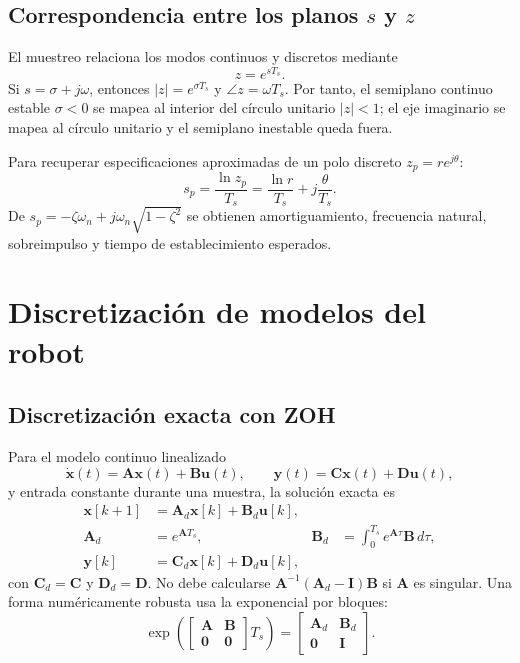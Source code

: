 \documentclass[11pt,letterpaper]{article}
\newcommand{\vect}[1]{\bm{#1}}
\newcommand{\mat}[1]{\bm{#1}}
\begin{document}
\subsection{Correspondencia entre los planos $s$ y $z$}
El muestreo relaciona los modos continuos y discretos mediante
\begin{equation}
 z=e^{sT_s}.
 \label{eq:szmap}
\end{equation}
Si $s=\sigma+j\omega$, entonces $|z|=e^{\sigma T_s}$ y
$\angle z=\omega T_s$. Por tanto, el semiplano continuo estable $\sigma<0$ se
mapea al interior del círculo unitario $|z|<1$; el eje imaginario se mapea al
círculo unitario y el semiplano inestable queda fuera.

Para recuperar especificaciones aproximadas de un polo discreto
$z_p=r e^{j\theta}$:
\begin{equation}
 s_p=\frac{\ln z_p}{T_s}
 =\frac{\ln r}{T_s}+j\frac{\theta}{T_s}.
\end{equation}
De $s_p=-\zeta\omega_n+j\omega_n\sqrt{1-\zeta^2}$ se obtienen amortiguamiento,
frecuencia natural, sobreimpulso y tiempo de establecimiento esperados.

\section{Discretización de modelos del robot}
\subsection{Discretización exacta con ZOH}
Para el modelo continuo linealizado
\begin{equation}
 \dot{\vect x}(t)=\mat A\vect x(t)+\mat B\vect u(t),\qquad
 \vect y(t)=\mat C\vect x(t)+\mat D\vect u(t),
 \label{eq:sscontinuous}
\end{equation}
y entrada constante durante una muestra, la solución exacta es
\begin{align}
 \vect x[k+1]&=\mat A_d\vect x[k]+\mat B_d\vect u[k],\label{eq:ssdiscrete}\\
 \mat A_d&=e^{\mat A T_s},&
 \mat B_d&=\int_0^{T_s}e^{\mat A\tau}\mat B\,d\tau,\label{eq:exactdisc}\\
 \vect y[k]&=\mat C_d\vect x[k]+\mat D_d\vect u[k],
\end{align}
con $\mat C_d=\mat C$ y $\mat D_d=\mat D$. No debe calcularse
$\mat A^{-1}(\mat A_d-\mat I)\mat B$ si $\mat A$ es singular. Una forma
numéricamente robusta usa la exponencial por bloques:
\begin{equation}
 \exp\!\left(
 \begin{bmatrix}\mat A&\mat B\\\mat 0&\mat 0\end{bmatrix}T_s
 \right)=
 \begin{bmatrix}\mat A_d&\mat B_d\\\mat 0&\mat I\end{bmatrix}.
 \label{eq:blockexp}
\end{equation}
\end{document}
